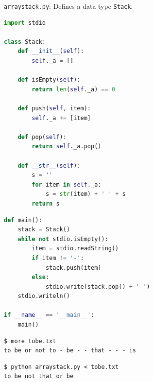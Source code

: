 \documentclass[8pt,a4paper,compress,handout]{beamer}
\begin{document}
\begin{frame}[fragile]
\begin{framed}
\tiny \lstinline{arraystack.py}: Defines a data type \lstinline{Stack}.
\end{framed}

\begin{lstlisting}[language=Python]
import stdio

class Stack:
    def __init__(self):
        self._a = []

    def isEmpty(self):
        return len(self._a) == 0

    def push(self, item):
        self._a += [item]

    def pop(self):
        return self._a.pop()

    def __str__(self):
        s = ''
        for item in self._a:
            s = str(item) + ' ' + s
        return s
\end{lstlisting}
\end{frame}

\begin{frame}[fragile]
\begin{lstlisting}[language=Python]
def main():
    stack = Stack()
    while not stdio.isEmpty():
        item = stdio.readString()
        if item != '-':
            stack.push(item)
        else:
            stdio.write(stack.pop() + ' ')
    stdio.writeln()

if __name__ == '__main__':
    main()
\end{lstlisting}

\begin{lstlisting}[language={}]
$ more tobe.txt
to be or not to - be - - that - - - is
\end{lstlisting}

\begin{lstlisting}[language={}]
$ python arraystack.py < tobe.txt 
to be not that or be
\end{lstlisting}
\end{frame}
\end{document}
